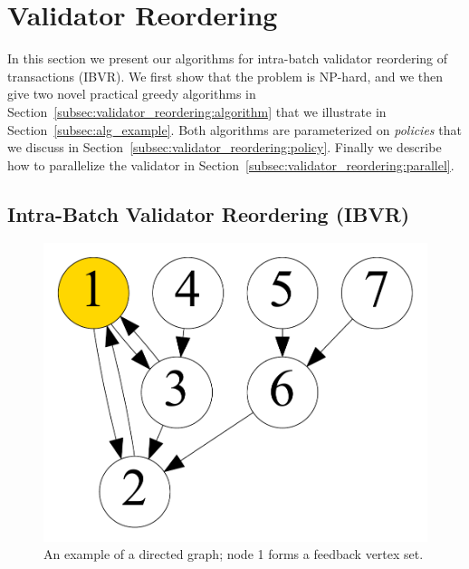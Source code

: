 \section{Validator Reordering}\label{sec:validator_reordering}

In this section we present our algorithms for intra-batch validator reordering of transactions (IBVR). We first show that the problem is NP-hard, and we then give two novel practical greedy algorithms in Section~\ref{subsec:validator_reordering:algorithm} that we illustrate in Section~\ref{subsec:alg_example}. Both algorithms are parameterized on \emph{policies} that
we discuss in Section~\ref{subsec:validator_reordering:policy}. Finally we describe how to parallelize the validator in Section~\ref{subsec:validator_reordering:parallel}.

\subsection{Intra-Batch Validator Reordering (IBVR)}\label{sec:ibvr}
\label{subsec:validator_reordering:algorithm}


\begin{figure}[t]
\centering
\includegraphics[width=0.3\columnwidth]{./alg_fig/fvs-eg}
\vspace{-1em}
\caption{An example of a directed graph; node 1 forms a feedback vertex set.}
\vspace{-1em}
\label{fig:fvs}
\end{figure}

